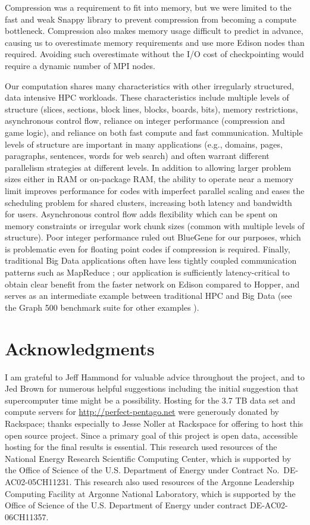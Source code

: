 \documentclass[conference]{IEEEtran}
\begin{document}
Compression was a requirement to fit into memory, but we were limited to the fast and weak Snappy library to
prevent compression from becoming a compute bottleneck.  Compression also makes memory usage difficult to
predict in advance, causing us to overestimate memory requirements and use more Edison nodes than required.
Avoiding such overestimate without the I/O cost of checkpointing would require a dynamic number of MPI nodes.

Our computation shares many characteristics with other irregularly structured, data intensive HPC workloads.
These characteristics include multiple levels of structure (slices, sections, block lines, blocks, boards,
bits), memory restrictions, asynchronous control flow, reliance on integer performance (compression and game
logic), and reliance on both fast compute and fast communication.  Multiple levels of structure are important
in many applications (e.g., domains, pages, paragraphs, sentences, words for web search) and often warrant
different parallelism strategies at different levels.  In addition to allowing larger problem sizes either
in RAM or on-package RAM, the ability to operate near a memory limit improves performance for codes with
imperfect parallel scaling and eases the scheduling problem for shared clusters, increasing both latency and
bandwidth for users.  Asynchronous control flow adds flexibility which can be spent on memory constraints or
irregular work chunk sizes (common with multiple levels of structure).  Poor integer performance ruled out
BlueGene for our purposes, which is problematic even for floating point codes if compression is required.
Finally, traditional Big Data applications often have less tightly coupled communication patterns such as
MapReduce \cite{dean2008mapreduce}; our application is sufficiently latency-critical to obtain clear benefit
from the faster network on Edison compared to Hopper, and serves as an intermediate example between traditional
HPC and Big Data (see the Graph 500 benchmark suite for other examples \cite{murphy2010graph500}).

\section*{Acknowledgments}

I am grateful to Jeff Hammond for valuable advice throughout the project, and to Jed Brown for numerous helpful
suggestions including the initial suggestion that supercomputer time might be a possibility.
Hosting for the 3.7 TB data set and compute servers for \url{http://perfect-pentago.net} were generously donated
by Rackspace; thanks especially to Jesse Noller at Rackspace for offering to host this open source project.
Since a primary goal of this project is open data, accessible hosting for the final results is essential.
This research used resources of the National Energy Research Scientific Computing Center, which is supported by
the Office of Science of the U.S. Department of Energy under Contract No.\ DE-AC02-05CH11231.  This research also
used resources of the Argonne Leadership Computing Facility at Argonne National Laboratory, which is supported by
the Office of Science of the U.S. Department of Energy under contract DE-AC02-06CH11357.



\end{document}
